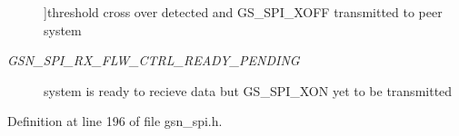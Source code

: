 \begin{Desc}
\begin{description}
{}]threshold cross over detected and GS\_\-SPI\_\-XOFF transmitted to peer system \item[{\em 
\hypertarget{a00587_ad34f711f03e3ba0055566119931ebfa6a1ee1ef11291783a59b3dd7ef78ac3a57}{
GSN\_\-SPI\_\-RX\_\-FLW\_\-CTRL\_\-READY\_\-PENDING}
\label{a00587_ad34f711f03e3ba0055566119931ebfa6a1ee1ef11291783a59b3dd7ef78ac3a57}
}]system is ready to recieve data but GS\_\-SPI\_\-XON yet to be transmitted \end{description}
\end{Desc}



Definition at line 196 of file gsn\_\-spi.h.




